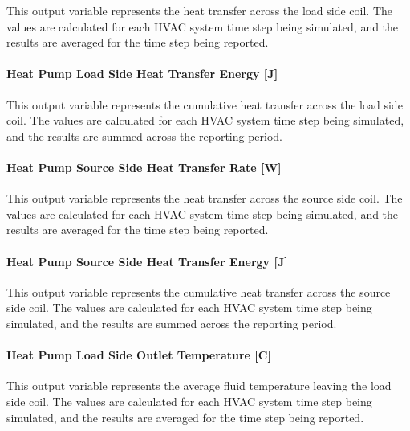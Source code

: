 This output variable represents the heat transfer across the load side coil. The values are calculated for each HVAC system time step being simulated, and the results are averaged for the time step being reported.

\paragraph{Heat Pump Load Side Heat Transfer Energy {[}J{]}}\label{water-to-water-heat-pump-load-side-heat-transfer-energy-j-1}

This output variable represents the cumulative heat transfer across the load side coil. The values are calculated for each HVAC system time step being simulated, and the results are summed across the reporting period.

\paragraph{Heat Pump Source Side Heat Transfer Rate {[}W{]}}\label{water-to-water-heat-pump-source-side-heat-transfer-rate-w-1}

This output variable represents the heat transfer across the source side coil. The values are calculated for each HVAC system time step being simulated, and the results are averaged for the time step being reported.

\paragraph{Heat Pump Source Side Heat Transfer Energy {[}J{]}}\label{water-to-water-heat-pump-source-side-heat-transfer-energy-j-1}

This output variable represents the cumulative heat transfer across the source side coil. The values are calculated for each HVAC system time step being simulated, and the results are summed across the reporting period.

\paragraph{Heat Pump Load Side Outlet Temperature {[}C{]}}\label{water-to-water-heat-pump-load-side-outlet-temperature-c-1}

This output variable represents the average fluid temperature leaving the load side coil. The values are calculated for each HVAC system time step being simulated, and the results are averaged for the time step being reported.

